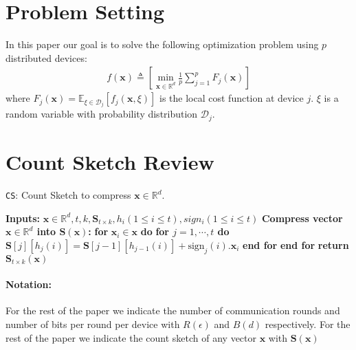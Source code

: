 \section{Problem Setting}
In this paper our goal is to solve the following optimization problem using $p$ distributed devices:
\begin{align}
    f(\boldsymbol{x})\triangleq \left[\min_{\boldsymbol{x}\in \mathbb{R}^{d}}\frac{1}{p}\sum_{j=1}^{p}F_j(\boldsymbol{x})\right]
\end{align}
where $F_j(\boldsymbol{x})=\mathbb{E}_{\xi\in\mathcal{D}_j}\left[f_j\left(\boldsymbol{x},\xi\right)\right]$ is the local cost function at device $j$. $\xi$ is a random variable with probability distribution $\mathcal{D}_j$.



\section{Count Sketch Review}

\begin{algorithm}[H]
\caption{\texttt{CS}: Count Sketch to compress ${\boldsymbol{x}}\in\mathbb{R}^{d}$. }\label{Alg:csketch}
\begin{algorithmic}[1]
\State \textbf{Inputs:} $\boldsymbol{x}\in\mathbb{R}^{d}, t, k, \mathbf{S}_{t\times k}, h_i (1\leq i\leq t), sign_i (1\leq i\leq t)$
\State \textbf{Compress vector $\boldsymbol{x}\in\mathbb{R}^{d}$ into $\mathbf{S}\left(\boldsymbol{x}\right)$:}
\State \textbf{for} $\boldsymbol{x}_i\in\boldsymbol{x}$ \textbf{do}
\State \quad\textbf{for $j=1,\cdots,t$ do}
\State \quad\quad $\mathbf{S}[j][h_j(i)]=\mathbf{S}[j-1][h_{j-1}(i)]+\text{sign}_j(i).\boldsymbol{x}_i$ 
\State \quad\textbf{end for}
\State \textbf{end for}
\State \textbf{return} $\mathbf{S}_{t\times k}(\boldsymbol{x})$
\end{algorithmic}
\end{algorithm}
\paragraph{Notation:} For the rest of the paper we indicate the number of communication rounds and number of bits per round per device with $R(\epsilon)$ and $B(d)$ respectively. For the rest of the paper we indicate the count sketch of any vector $\boldsymbol{x}$ with $\mathbf{S}(\boldsymbol{x})$
